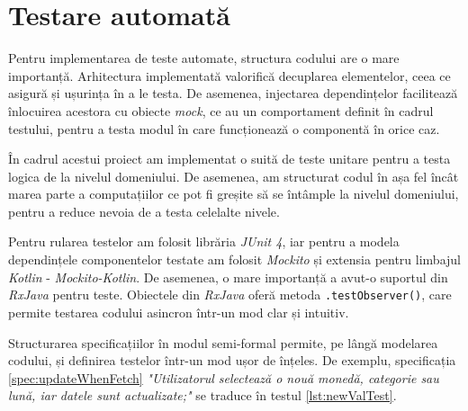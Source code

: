 \section{Testare automată}

Pentru implementarea de teste automate, structura codului are o mare importanță. Arhitectura implementată valorifică decuplarea elementelor, ceea ce asigură și ușurința în a le testa. De asemenea, injectarea dependințelor facilitează înlocuirea acestora cu obiecte \emph{mock}, ce au un comportament definit în cadrul testului, pentru a testa modul în care funcționează o componentă în orice caz.

În cadrul acestui proiect am implementat o suită de teste unitare pentru a testa logica de la nivelul domeniului. De asemenea, am structurat codul în așa fel încât marea parte a computațiilor ce pot fi greșite să se întâmple la nivelul domeniului, pentru a reduce nevoia de a testa celelalte nivele. 

Pentru rularea testelor am folosit librăria \emph{JUnit 4}, iar pentru a modela dependințele componentelor testate am folosit \emph{Mockito} și extensia pentru limbajul \emph{Kotlin} - \emph{Mockito-Kotlin}. De asemenea, o mare importanță a avut-o suportul din \emph{RxJava} pentru teste. Obiectele din \emph{RxJava} oferă metoda \texttt{.testObserver()}, care permite testarea codului asincron într-un mod clar și intuitiv.

Structurarea specificațiilor în modul semi-formal permite, pe lângă modelarea codului, și definirea testelor într-un mod ușor de înțeles. De exemplu, specificația \ref{spec:updateWhenFetch} \emph{"Utilizatorul selectează o nouă monedă, categorie sau lună, iar datele sunt actualizate;"} se traduce în testul \ref{lst:newValTest}.

\clearpage



